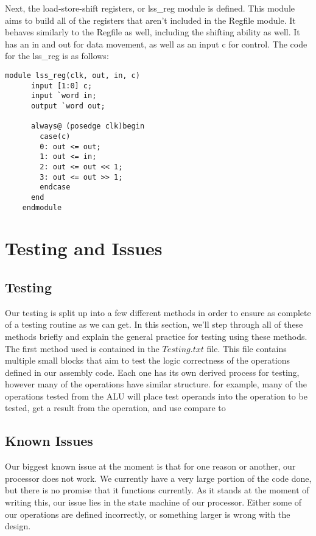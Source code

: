 \documentclass[journal]{IEEEtran}
\begin{document}
	Next, the load\--store\--shift registers, or lss\_reg module is defined. This module aims to build all of the registers that aren't included in the Regfile module. It behaves similarly to the Regfile as well, including the shifting ability as well. It has an in and out for data movement, as well as an input c for control. The code for the lss\_reg is as follows:
	
	\begin{Verbatim}[fontsize=\small]
	module lss_reg(clk, out, in, c)
	  input [1:0] c;
	  input `word in;
	  output `word out;
	
	  always@ (posedge clk)begin
	    case(c)
		0: out <= out;
		1: out <= in;
		2: out <= out << 1;
		3: out <= out >> 1;
		endcase
	  end
	endmodule
	\end{Verbatim}
	
	
	
\section{Testing and Issues}
\subsection{Testing}
	Our testing is split up into a few different methods in order to ensure as complete of a testing routine as we can get. In this section, we'll step through all of these methods briefly and explain the general practice for testing using these methods. \\
	
	The first method used is contained in the $Testing.txt$ file. This file contains multiple small blocks that aim to test the logic correctness of the operations defined in our assembly code. Each one has its own derived process for testing, however many of the operations have similar structure. for example, many of the operations tested from the ALU will place test operands into the operation to be tested, get a result from the operation, and use compare to 

\subsection{Known Issues}
	Our biggest known issue at the moment is that for one reason or another, our processor does not work. We currently have a very large portion of the code done, but there is no promise that it functions currently. As it stands at the moment of writing this, our issue lies in the state machine of our processor. Either some of our operations are defined incorrectly, or something larger is wrong with the design. 
\end{document}
